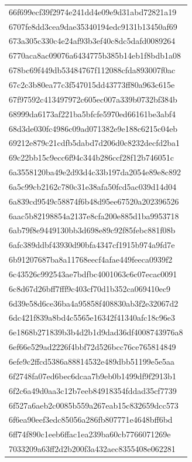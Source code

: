 \begin{tabular}{l}
66f699ecf39f2974e241dd4e09e9d31abd72821a19 \\
6707fe8dd3cea9dae35340194edc9131b13450af69 \\
673a305c330c4e24af93b3ef40c8dc5dafd0089264 \\
6770aca8ac09076a6434775b385b14eb1f8bdb1a08 \\
678bc69f449db53484767f112088cfda893007f0ac \\
67c2c3b80ea77c3f547015dd43773ff80a963c615e \\
67f97592c413497972c605ec007a339b0732bf384b \\
68999da6173af221ba5bfcfe5970ed66161be3abf4 \\
68d3de030fc4986c09ad071382e9e188c6215c04eb \\
69212e879c21cdfb5dabd7d206d0c8232decfd2ba1 \\
69c22bb15c9ecc6f94c344b286ccf28f12b746051c \\
6a3558120ba49e2d93d4c33b197da2054e89e8c892 \\
6a5c99cb2162c780c31e38afa50fcd5ac039d14d04 \\
6a839cd9549c58874f6b48d95ee67520a202396526 \\
6aac5b82198854a2137e8cfa200e885d1ba9953718 \\
6ab79f8e9449130bb3d698e89c92f85febc881f08b \\
6afc389ddbf43930d90bfa4347cf1915b974a9fd7e \\
6b91207687ba8a11768eecf4afae449feeca0939f2 \\
6c43526c992543ae7bdfbc4001063c6c07ecac0091 \\
6c8d67d26bff7fff9c403cf70d1b352ca069410ec9 \\
6d39e58d6ce36ba4a95858f408830ab3f2e32067d2 \\
6dc421f839a8bd4c5565e16342f41340afc18c96e3 \\
6e1868b271839b3b4d2b1d9dad36df4008743976a8 \\
6ef66e529ad2226f4bbf72d526bcc76ce765814849 \\
6efe9c2ffcd5386a88814532e489dbb51199e5e5aa \\
6f2748fa07ed6bec6dcaa7b9eb0b1499df9f2913b1 \\
6f2c6a49d0aa3c12b7eeb84918354fddad35cf7739 \\
6f527a6aeb2c0085b559a267eab15c832659dcc573 \\
6f6ea90eef3edc85056a286fb807771e4648bff6bd \\
6ff74f890c1eeb6ffac1ea239ba60cb7766071269e \\
7033209a63ff2d2b200f3a432aec8355408e062281 \\

\end{tabular}
